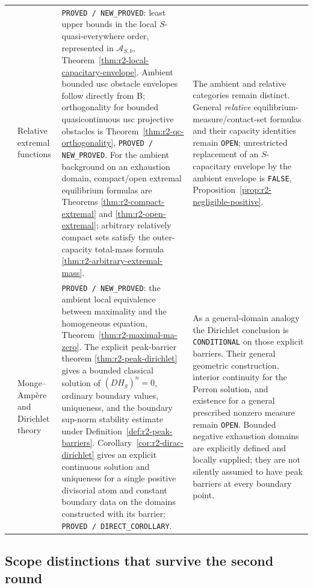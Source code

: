 \begin{longtable}{@{}>{\raggedright\arraybackslash}p{}>{\raggedright\arraybackslash}p{}>{\raggedright\arraybackslash}p{}>{\raggedright\arraybackslash}p{}@{}}
10 & Relative extremal functions &
\texttt{PROVED / NEW\_PROVED}: least upper bounds in the local
$S$-quasi-everywhere order, represented in $\mathcal A_{S,b}$,
Theorem~\ref{thm:r2-local-capacitary-envelope}.
Ambient bounded usc obstacle envelopes follow directly from B;
orthogonality for bounded quasicontinuous usc projective obstacles
is Theorem~\ref{thm:r2-qc-orthogonality},
\texttt{PROVED / NEW\_PROVED}.
For the ambient background on an exhaustion domain, compact/open
extremal equilibrium formulas are Theorems
\ref{thm:r2-compact-extremal} and \ref{thm:r2-open-extremal};
arbitrary relatively compact sets satisfy the outer-capacity
total-mass formula \ref{thm:r2-arbitrary-extremal-mass}. &
The ambient and relative categories remain distinct. General
\emph{relative} equilibrium-measure/contact-set formulas and their
capacity identities remain \texttt{OPEN}; unrestricted replacement
of an $S$-capacitary envelope by the ambient envelope is \texttt{FALSE},
Proposition~\ref{prop:r2-negligible-positive}.\\[5pt]

11 & Monge--Amp\`ere and Dirichlet theory &
\texttt{PROVED / NEW\_PROVED}: the ambient local equivalence between
maximality and the homogeneous equation,
Theorem~\ref{thm:r2-maximal-ma-zero}.
The explicit peak-barrier theorem
\ref{thm:r2-peak-dirichlet} gives a bounded classical solution of
$(DH_g)^n=0$, ordinary boundary values, uniqueness, and the boundary
sup-norm stability estimate under
Definition~\ref{def:r2-peak-barriers}.
Corollary~\ref{cor:r2-dirac-dirichlet} gives an explicit continuous
solution and uniqueness for a single positive divisorial atom and
constant boundary data on the domains constructed with its barrier:
\texttt{PROVED / DIRECT\_COROLLARY}. &
As a general-domain analogy the Dirichlet conclusion is
\texttt{CONDITIONAL} on those explicit barriers. Their general
geometric construction, interior continuity for the Perron solution,
and existence for a general prescribed nonzero measure remain
\texttt{OPEN}. Bounded negative exhaustion domains are explicitly
defined and locally supplied; they are not silently assumed to have
peak barriers at every boundary point.\\[3pt]
\hline
\end{longtable}

\subsection{Scope distinctions that survive the second round}

